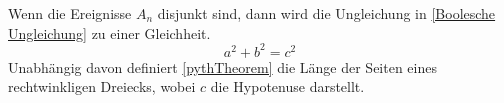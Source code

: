 \label{ch:Aufgabenstellung}


Wenn die Ereignisse $A_n$ disjunkt sind, dann wird die Ungleichung
in \autoref{Boolesche Ungleichung} zu einer Gleichheit. 
\begin{equation}\label{pythTheorem}
  a^2+b^2=c^2
\end{equation}
Unabhängig davon definiert \autoref{pythTheorem} die Länge der Seiten eines rechtwinkligen Dreiecks, wobei $c$ die Hypotenuse darstellt. 
